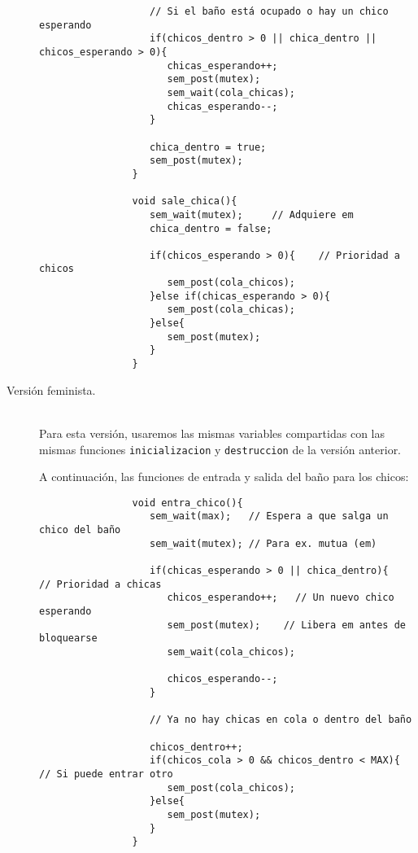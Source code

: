 \begin{ejercicio}
\begin{description}
\begin{verbatim}
                   // Si el baño está ocupado o hay un chico esperando
                   if(chicos_dentro > 0 || chica_dentro || chicos_esperando > 0){
                      chicas_esperando++;
                      sem_post(mutex);
                      sem_wait(cola_chicas);
                      chicas_esperando--;
                   }

                   chica_dentro = true;
                   sem_post(mutex);
                }

                void sale_chica(){
                   sem_wait(mutex);     // Adquiere em
                   chica_dentro = false;

                   if(chicos_esperando > 0){    // Prioridad a chicos
                      sem_post(cola_chicos);
                   }else if(chicas_esperando > 0){
                      sem_post(cola_chicas);
                   }else{
                      sem_post(mutex);
                   }
                }
            \end{verbatim}    
        \item [Versión feminista.]~\\
            Para esta versión, usaremos las mismas variables compartidas con las mismas funciones \verb|inicializacion| y \verb|destruccion| de la versión anterior.
            
            A continuación, las funciones de entrada y salida del baño para los chicos:
            \begin{verbatim}
                void entra_chico(){
                   sem_wait(max);   // Espera a que salga un chico del baño
                   sem_wait(mutex); // Para ex. mutua (em)
                   
                   if(chicas_esperando > 0 || chica_dentro){    // Prioridad a chicas
                      chicos_esperando++;   // Un nuevo chico esperando
                      sem_post(mutex);    // Libera em antes de bloquearse
                      sem_wait(cola_chicos);

                      chicos_esperando--;
                   }

                   // Ya no hay chicas en cola o dentro del baño

                   chicos_dentro++;
                   if(chicos_cola > 0 && chicos_dentro < MAX){  // Si puede entrar otro
                      sem_post(cola_chicos);
                   }else{
                      sem_post(mutex);
                   }
                }


\end{verbatim}
\end{description}
\end{ejercicio}
